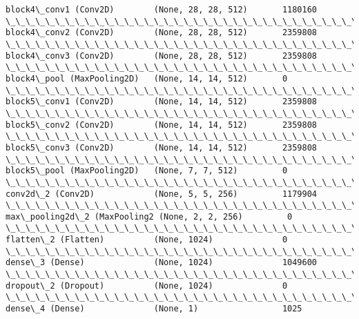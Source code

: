 \documentclass[11pt]{article}
\begin{document}
\begin{Verbatim}[commandchars=\\\{\}]
block4\_conv1 (Conv2D)        (None, 28, 28, 512)       1180160   
\_\_\_\_\_\_\_\_\_\_\_\_\_\_\_\_\_\_\_\_\_\_\_\_\_\_\_\_\_\_\_\_\_\_\_\_\_\_\_\_\_\_\_\_\_\_\_\_\_\_\_\_\_\_\_\_\_\_\_\_\_\_\_\_\_
block4\_conv2 (Conv2D)        (None, 28, 28, 512)       2359808   
\_\_\_\_\_\_\_\_\_\_\_\_\_\_\_\_\_\_\_\_\_\_\_\_\_\_\_\_\_\_\_\_\_\_\_\_\_\_\_\_\_\_\_\_\_\_\_\_\_\_\_\_\_\_\_\_\_\_\_\_\_\_\_\_\_
block4\_conv3 (Conv2D)        (None, 28, 28, 512)       2359808   
\_\_\_\_\_\_\_\_\_\_\_\_\_\_\_\_\_\_\_\_\_\_\_\_\_\_\_\_\_\_\_\_\_\_\_\_\_\_\_\_\_\_\_\_\_\_\_\_\_\_\_\_\_\_\_\_\_\_\_\_\_\_\_\_\_
block4\_pool (MaxPooling2D)   (None, 14, 14, 512)       0         
\_\_\_\_\_\_\_\_\_\_\_\_\_\_\_\_\_\_\_\_\_\_\_\_\_\_\_\_\_\_\_\_\_\_\_\_\_\_\_\_\_\_\_\_\_\_\_\_\_\_\_\_\_\_\_\_\_\_\_\_\_\_\_\_\_
block5\_conv1 (Conv2D)        (None, 14, 14, 512)       2359808   
\_\_\_\_\_\_\_\_\_\_\_\_\_\_\_\_\_\_\_\_\_\_\_\_\_\_\_\_\_\_\_\_\_\_\_\_\_\_\_\_\_\_\_\_\_\_\_\_\_\_\_\_\_\_\_\_\_\_\_\_\_\_\_\_\_
block5\_conv2 (Conv2D)        (None, 14, 14, 512)       2359808   
\_\_\_\_\_\_\_\_\_\_\_\_\_\_\_\_\_\_\_\_\_\_\_\_\_\_\_\_\_\_\_\_\_\_\_\_\_\_\_\_\_\_\_\_\_\_\_\_\_\_\_\_\_\_\_\_\_\_\_\_\_\_\_\_\_
block5\_conv3 (Conv2D)        (None, 14, 14, 512)       2359808   
\_\_\_\_\_\_\_\_\_\_\_\_\_\_\_\_\_\_\_\_\_\_\_\_\_\_\_\_\_\_\_\_\_\_\_\_\_\_\_\_\_\_\_\_\_\_\_\_\_\_\_\_\_\_\_\_\_\_\_\_\_\_\_\_\_
block5\_pool (MaxPooling2D)   (None, 7, 7, 512)         0         
\_\_\_\_\_\_\_\_\_\_\_\_\_\_\_\_\_\_\_\_\_\_\_\_\_\_\_\_\_\_\_\_\_\_\_\_\_\_\_\_\_\_\_\_\_\_\_\_\_\_\_\_\_\_\_\_\_\_\_\_\_\_\_\_\_
conv2d\_2 (Conv2D)            (None, 5, 5, 256)         1179904   
\_\_\_\_\_\_\_\_\_\_\_\_\_\_\_\_\_\_\_\_\_\_\_\_\_\_\_\_\_\_\_\_\_\_\_\_\_\_\_\_\_\_\_\_\_\_\_\_\_\_\_\_\_\_\_\_\_\_\_\_\_\_\_\_\_
max\_pooling2d\_2 (MaxPooling2 (None, 2, 2, 256)         0         
\_\_\_\_\_\_\_\_\_\_\_\_\_\_\_\_\_\_\_\_\_\_\_\_\_\_\_\_\_\_\_\_\_\_\_\_\_\_\_\_\_\_\_\_\_\_\_\_\_\_\_\_\_\_\_\_\_\_\_\_\_\_\_\_\_
flatten\_2 (Flatten)          (None, 1024)              0         
\_\_\_\_\_\_\_\_\_\_\_\_\_\_\_\_\_\_\_\_\_\_\_\_\_\_\_\_\_\_\_\_\_\_\_\_\_\_\_\_\_\_\_\_\_\_\_\_\_\_\_\_\_\_\_\_\_\_\_\_\_\_\_\_\_
dense\_3 (Dense)              (None, 1024)              1049600   
\_\_\_\_\_\_\_\_\_\_\_\_\_\_\_\_\_\_\_\_\_\_\_\_\_\_\_\_\_\_\_\_\_\_\_\_\_\_\_\_\_\_\_\_\_\_\_\_\_\_\_\_\_\_\_\_\_\_\_\_\_\_\_\_\_
dropout\_2 (Dropout)          (None, 1024)              0         
\_\_\_\_\_\_\_\_\_\_\_\_\_\_\_\_\_\_\_\_\_\_\_\_\_\_\_\_\_\_\_\_\_\_\_\_\_\_\_\_\_\_\_\_\_\_\_\_\_\_\_\_\_\_\_\_\_\_\_\_\_\_\_\_\_
dense\_4 (Dense)              (None, 1)                 1025      

\end{Verbatim}
\end{document}
